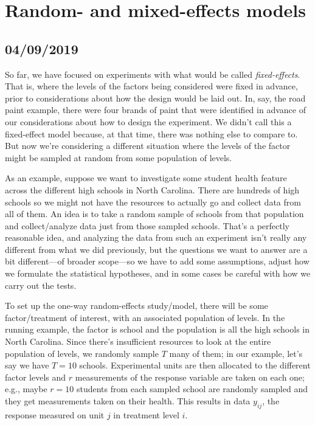 \documentclass[a4paper, 12pt]{article}
\theoremstyle{plain}
\theoremstyle{definition}
\theoremstyle{remark}
\begin{document}
\section{Random- and mixed-effects models}

\subsection*{04/09/2019}

So far, we have focused on experiments with what would be called {\em fixed-effects}.  That is, where the levels of the factors being considered were fixed in advance, prior to considerations about how the design would be laid out.  In, say, the road paint example, there were four brands of paint that were identified in advance of our considerations about how to design the experiment.  We didn't call this a fixed-effect model because, at that time, there was nothing else to compare to.  But now we're considering a different situation where the levels of the factor might be sampled at random from some population of levels.  

As an example, suppose we want to investigate some student health feature across the different high schools in North Carolina.  There are hundreds of high schools so we might not have the resources to actually go and collect data from all of them.  An idea is to take a random sample of schools from that population and collect/analyze data just from those sampled schools.  That's a perfectly reasonable idea, and analyzing the data from such an experiment isn't really any different from what we did previously, but the questions we want to answer are a bit different---of broader scope---so we have to add some assumptions, adjust how we formulate the statistical hypotheses, and in some cases be careful with how we carry out the tests.  

To set up the one-way random-effects study/model, there will be some factor/treatment of interest, with an associated population of levels.  In the running example, the factor is school and the population is all the high schools in North Carolina.  Since there's insufficient resources to look at the entire population of levels, we randomly sample $T$ many of them; in our example, let's say we have $T=10$ schools.  Experimental units are then allocated to the different factor levels and $r$ measurements of the response variable are taken on each one; e.g., maybe $r=10$ students from each sampled school are randomly sampled and they get measurements taken on their health.  This results in data $y_{ij}$, the response measured on unit $j$ in treatment level $i$.  
\end{document}
